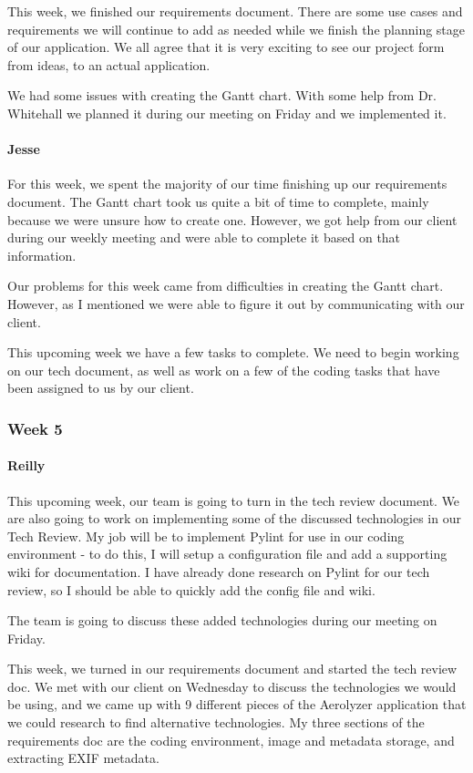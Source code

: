 \documentclass[onecolumn, draftclsnofoot,10pt, compsoc]{IEEEtran}
\begin{document}
\begin{flushleft}
 
This week, we finished our requirements document. There are some use cases and requirements we will continue to add as needed while we finish the planning stage of our application. We all agree that it is very exciting to see our project form from ideas, to an actual application.
 
 
We had some issues with creating the Gantt chart. With some help from Dr. Whitehall we planned it during our meeting on Friday and we implemented it.
 
\paragraph{Jesse}
 
For this week, we spent the majority of our time finishing up our requirements document. The Gantt chart took us quite a bit of time to complete, mainly because we were unsure how to create one. However, we got help from our client during our weekly meeting and were able to complete it based on that information.
 
 
Our problems for this week came from difficulties in creating the Gantt chart. However, as I mentioned we were able to figure it out by communicating with our client.
 
 
This upcoming week we have a few tasks to complete. We need to begin working on our tech document, as well as work on a few of the coding tasks that have been assigned to us by our client.
 
\subsubsection{Week 5}
\paragraph{Reilly}
 
This upcoming week, our team is going to turn in the tech review document. We are also going to work on implementing some of the discussed technologies in our Tech Review. My job will be to implement Pylint for use in our coding environment - to do this, I will setup a configuration file and add a supporting wiki for documentation. I have already done research on Pylint for our tech review, so I should be able to quickly add the config file and wiki.
 
The team is going to discuss these added technologies during our meeting on Friday.
 
 
This week, we turned in our requirements document and started the tech review doc. We met with our client on Wednesday to discuss the technologies we would be using, and we came up with 9 different pieces of the Aerolyzer application that we could research to find alternative technologies. My three sections of the requirements doc are the coding environment, image and metadata storage, and extracting EXIF metadata.
 

\end{flushleft}
\end{document}
